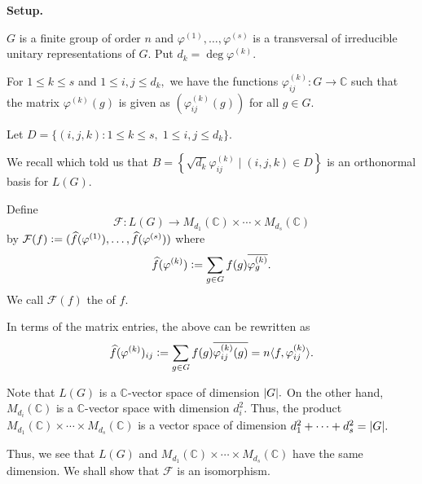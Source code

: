 \documentclass[12pt]{article}	%
\begin{document}
\begin{aside}
    \textbf{Setup.}

    $G$ is a finite group of order $n$ and $\varphi^{(1)}, \ldots, \varphi^{(s)}$ is a transversal of irreducible unitary representations of $G.$ Put $d_k = \deg \varphi^{(k)}.$ 

    For $1 \le k \le s$ and $1 \le i, j \le d_k,$ we have the functions $\varphi^{(k)}_{ij} : G \to \mathbb{C}$ such that the matrix $\varphi^{(k)}(g)$ is given as $(\varphi^{(k)}_{ij}(g))$ for all $g \in G.$

    Let $D = \{(i, j, k) : 1 \le k \le s,\; 1 \le i, j \le d_k\}.$

    We recall  which told us that $B = \left\{\sqrt{d_k}\varphi_{ij}^{(k)} \mid (i, j, k) \in D\right\}$ is an orthonormal basis for $L(G).$
\end{aside}

\begin{defn}%
    Define
    \begin{equation*} 
        \mathcal{F} : L(G) \to M_{d_1}(\mathbb{C}) \times \cdots \times M_{d_s}(\mathbb{C})
    \end{equation*}
    by $\mathcal{F}(f) \vcentcolon= (\widehat{f}(\varphi^{(1)}), \ldots, \widehat{f}(\varphi^{(s)}))$ where
    \begin{equation*}
        \widehat{f}(\varphi^{(k)}) \vcentcolon= \sum_{g \in G} f(g)\overline{\varphi^{(k)}_g}.
    \end{equation*}
    We call $\mathcal{F}(f)$ the  of $f.$
\end{defn}
\begin{rem}
    In terms of the matrix entries, the above can be rewritten as
    \begin{equation} \label{eq:012}
        \widehat{f}(\varphi^{(k)})_{ij} \vcentcolon= \sum_{g \in G} f(g)\overline{\varphi^{(k)}_{ij}(g)} = n\langle f, \varphi^{(k)}_{ij}\rangle.
    \end{equation}
\end{rem}

\begin{rem} \label{rem:dimLGdimmatrix}
    Note that $L(G)$ is a $\mathbb{C}$-vector space of dimension ${\left\lvert G \right\lvert}.$ On the other hand, $M_{d_i}(\mathbb{C})$ is a $\mathbb{C}$-vector space with dimension $d_i^2.$ Thus, the product $M_{d_1}(\mathbb{C}) \times \cdots \times M_{d_s}(\mathbb{C})$ is a vector space of dimension $d_1^2 + \cdots + d_s^2 = {\left\lvert G \right\lvert}.$

    Thus, we see that $L(G)$ and $M_{d_1}(\mathbb{C}) \times \cdots \times M_{d_s}(\mathbb{C})$ have the same dimension. We shall show that $\mathcal{F}$ is an isomorphism.
\end{rem}
\end{document}
